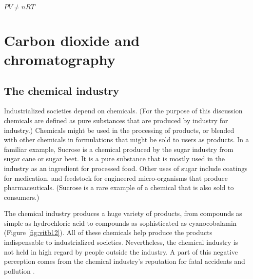
\begin{savequote}[\quotewidth]
$PV \ne nRT$
\end{savequote}

\chapter{Carbon dioxide and chromatography} %

\label{Chapter2} %



\section{The chemical industry}

Industrialized societies depend on chemicals. (For the purpose of this
discussion chemicals are defined as pure substances that are produced by
industry for industry.) Chemicals might be used in the processing of products,
or blended with other chemicals in formulations that might be sold to users as
products. In a familiar example, Sucrose is a chemical produced by the sugar
industry from sugar cane or sugar beet. It is a pure substance that is mostly
used in the industry as an ingredient for processed food. Other uses of sugar
include coatings for medication, and feedstock for engineered micro-organisms
that produce pharmaceuticals. (Sucrose is a rare example of a chemical that is
also sold to consumers.)
 
The chemical industry produces a huge variety of products, from compounds as
simple as hydrochloric acid to compounds as sophisticated as cyanocobalamin
(Figure \ref{fig:vitb12}). All of these chemicals help produce the products
indispensable to industrialized societies. Nevertheless, the chemical industry
is not held in high regard by people outside the industry. A part of this
negative perception comes from the chemical industry's reputation for fatal
accidents and pollution \autocite{Gumm2015}.

